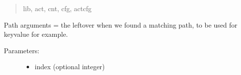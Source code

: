 \documentclass[letterpaper,10pt,english]{sphinxmanual}
\begin{document}
\begin{fulllineitems}
\begin{fulllineitems}
\begin{description}
\begin{quote}
lib, act, cnt, cfg, actcfg
\end{quote}

\end{description}

\end{fulllineitems}


\begin{fulllineitems}
\label{knop_nav:knop_nav.filenaming}
\end{fulllineitems}



\begin{fulllineitems}
\end{fulllineitems}


\begin{fulllineitems}
\label{knop_nav:knop_nav.fileroot}
\end{fulllineitems}



\begin{fulllineitems}
\end{fulllineitems}


\begin{fulllineitems}
\label{knop_nav:knop_nav.findnav}
\end{fulllineitems}


\begin{fulllineitems}
\label{knop_nav:knop_nav.getargs}
\end{fulllineitems}


\begin{fulllineitems}
Path arguments = the leftover when we found a matching path, to be used for keyvalue for example.
\begin{description}
\item[{Parameters:}] \leavevmode\begin{itemize}
\item {} 
index (optional integer)
\begin{quote}


\end{quote}
\end{itemize}
\end{description}
\end{fulllineitems}
\end{fulllineitems}
\end{document}
